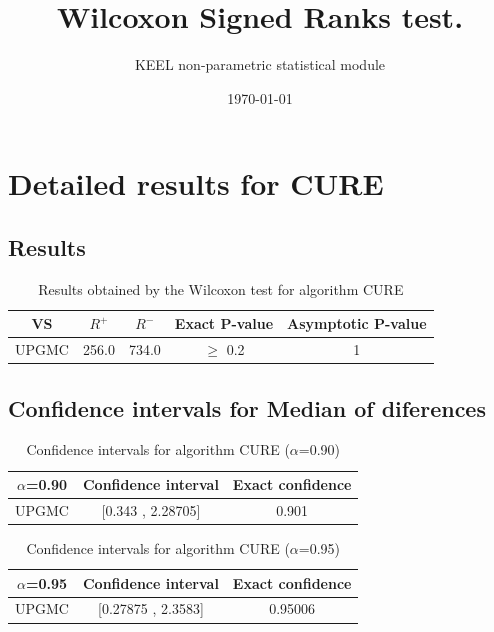 \documentclass[a4paper,10pt]{article}
\title{Wilcoxon Signed Ranks test.}
\date{\today}
\author{KEEL non-parametric statistical module}
\begin{document}
\pagestyle{empty}
\maketitle
\thispagestyle{empty}



\section{Detailed results for CURE}


\subsection{Results}

\begin{table}[!htp]
\centering\small
\begin{tabular}{
|c|c|c|c|c|}
\hline
 VS & $R^{+}$ & $R^{-}$ & Exact P-value & Asymptotic P-value \\ \hline 
UPGMC & 256.0 & 734.0 & $\geq$ 0.2 & 1\\ \hline 

\end{tabular}
\caption{Results obtained by the Wilcoxon test for algorithm CURE}
\end{table}

\subsection{Confidence intervals for Median of diferences}

\begin{table}[!htp]
\centering\small
\begin{tabular}{
|c|c|c|}
\hline
 $\alpha$=0.90 & Confidence interval & Exact confidence \\ \hline 
UPGMC & [0.343 , 2.28705] & 0.901\\ \hline 

\end{tabular}
\caption{Confidence intervals for algorithm CURE ($\alpha$=0.90)}
\end{table}
\begin{table}[!htp]
\centering\small
\begin{tabular}{
|c|c|c|}
\hline
 $\alpha$=0.95 & Confidence interval & Exact confidence \\ \hline 
UPGMC & [0.27875 , 2.3583] & 0.95006\\ \hline 

\end{tabular}
\caption{Confidence intervals for algorithm CURE ($\alpha$=0.95)}
\end{table}
\end{document}
